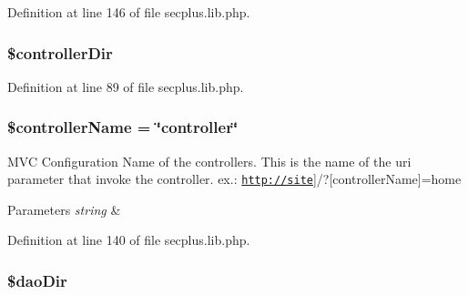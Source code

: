 Definition at line 146 of file secplus.lib.php.

\hypertarget{class_sec_plus_1_1_config_a3c641dd8bef8033ed0ff088f937e136c}{
\subsubsection[{\$controllerDir}]{\setlength{\rightskip}{0pt plus 5cm}\$controllerDir}}
\label{class_sec_plus_1_1_config_a3c641dd8bef8033ed0ff088f937e136c}


Definition at line 89 of file secplus.lib.php.

\hypertarget{class_sec_plus_1_1_config_a4845baceacf6ec5e204c54d91caa2f25}{
\subsubsection[{\$controllerName}]{\setlength{\rightskip}{0pt plus 5cm}\$controllerName = \char`\"{}controller\char`\"{}}}
\label{class_sec_plus_1_1_config_a4845baceacf6ec5e204c54d91caa2f25}
MVC Configuration Name of the controllers. This is the name of the uri parameter that invoke the controller. ex.: \href{http://site}{\tt http://site}\mbox{]}/?\mbox{[}controllerName\mbox{]}=home 
\begin{DoxyParams}{Parameters}
{\em string} & \\
\hline
\end{DoxyParams}


Definition at line 140 of file secplus.lib.php.

\hypertarget{class_sec_plus_1_1_config_a5430f8a675b729372fc0109059692046}{
\subsubsection[{\$daoDir}]{\setlength{\rightskip}{0pt plus 5cm}\$daoDir}}
\label{class_sec_plus_1_1_config_a5430f8a675b729372fc0109059692046}


